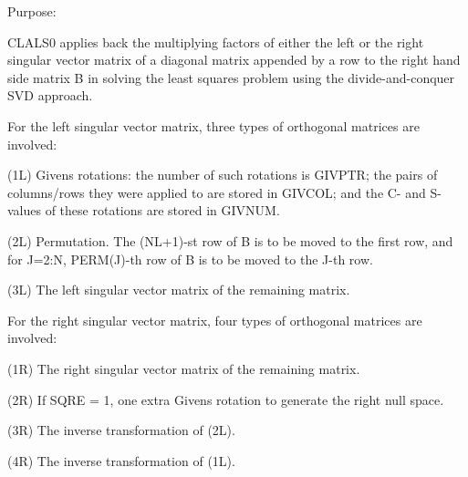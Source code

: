  \begin{DoxyParagraph}{Purpose\+: }
\begin{DoxyVerb} CLALS0 applies back the multiplying factors of either the left or the
 right singular vector matrix of a diagonal matrix appended by a row
 to the right hand side matrix B in solving the least squares problem
 using the divide-and-conquer SVD approach.

 For the left singular vector matrix, three types of orthogonal
 matrices are involved:

 (1L) Givens rotations: the number of such rotations is GIVPTR; the
      pairs of columns/rows they were applied to are stored in GIVCOL;
      and the C- and S-values of these rotations are stored in GIVNUM.

 (2L) Permutation. The (NL+1)-st row of B is to be moved to the first
      row, and for J=2:N, PERM(J)-th row of B is to be moved to the
      J-th row.

 (3L) The left singular vector matrix of the remaining matrix.

 For the right singular vector matrix, four types of orthogonal
 matrices are involved:

 (1R) The right singular vector matrix of the remaining matrix.

 (2R) If SQRE = 1, one extra Givens rotation to generate the right
      null space.

 (3R) The inverse transformation of (2L).

 (4R) The inverse transformation of (1L).\end{DoxyVerb}
 
\end{DoxyParagraph}

